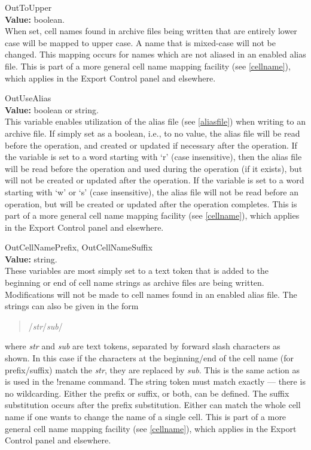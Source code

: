 \begin{description}
\item{\et OutToUpper}\\
{\bf Value:} boolean.\\
When set, cell names found in archive files being written that are
entirely lower case will be mapped to upper case.  A name that is
mixed-case will not be changed.  This mapping occurs for names which
are not aliased in an enabled alias file.  This is part of a more
general cell name mapping facility (see \ref{cellname}), which applies
in the {\cb Export Control} panel and elsewhere.

\item{\et OutUseAlias}\\
{\bf Value:} boolean or string.\\
This variable enables utilization of the alias file (see
\ref{aliasfile}) when writing to an archive file.  If simply set as a
boolean, i.e., to no value, the alias file will be read before the
operation, and created or updated if necessary after the operation. 
If the variable is set to a word starting with `{\vt r}' (case
insensitive), then the alias file will be read before the operation
and used during the operation (if it exists), but will not be created
or updated after the operation.  If the variable is set to a word
starting with `{\vt w}' or `{\vt s}' (case insensitive), the alias
file will not be read before an operation, but will be created or
updated after the operation completes.  This is part of a more general
cell name mapping facility (see \ref{cellname}), which applies
in the {\cb Export Control} panel and elsewhere.

\item{{\et OutCellNamePrefix}, {\et OutCellNameSuffix}}\\
{\bf Value:} string.\\
These variables are most simply set to a text token that is added to
the beginning or end of cell name strings as archive files are being
written.  Modifications will not be made to cell names found in an
enabled alias file.  The strings can also be given in the form
\begin{quote}
/{\it str\/}/{\it sub\/}/
\end{quote}
where {\it str} and {\it sub} are text tokens, separated by forward
slash characters as shown.  In this case if the characters at the
beginning/end of the cell name (for prefix/suffix) match the {\it
str}, they are replaced by {\it sub}.  This is the same action as is
used in the {\cb !rename} command.  The string token must match
exactly --- there is no wildcarding.  Either the prefix or suffix, or
both, can be defined.  The suffix substitution occurs after the prefix
substitution.  Either can match the whole cell name if one wants to
change the name of a single cell.  This is part of a more general cell
name mapping facility (see \ref{cellname}), which applies
in the {\cb Export Control} panel and elsewhere.


\end{description}
